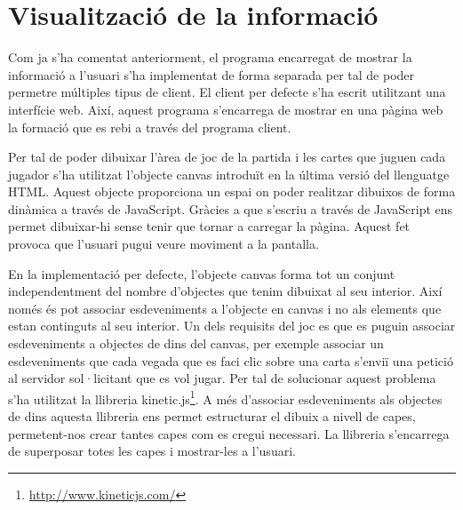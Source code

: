 \section{Visualització de la informació}
\label{sec:visualitzacio-informacio}

Com ja s'ha comentat anteriorment, el programa encarregat de mostrar la informació a l'usuari s'ha implementat de forma separada per tal de poder permetre múltiples tipus de client. El client per defecte s'ha escrit utilitzant una interfície web. Així, aquest programa s'encarrega de mostrar en una pàgina web la formació que es rebi a través del programa client.

Per tal de poder dibuixar l'àrea de joc de la partida i les cartes que juguen cada jugador s'ha utilitzat l'objecte canvas introduït en la última versió del llenguatge HTML. Aquest objecte proporciona un espai on poder realitzar dibuixos de forma dinàmica a través de JavaScript. Gràcies a que s'escriu a través de JavaScript ens permet dibuixar-hi sense tenir que tornar a carregar la pàgina. Aquest fet provoca que l'usuari pugui veure moviment a la pantalla. 

En la implementació per defecte, l'objecte canvas forma tot un conjunt independentment del nombre d'objectes que tenim dibuixat al seu interior. Així només és pot associar esdeveniments a l'objecte en canvas i no als elements que estan continguts al seu interior. Un dels requisits del joc es que es puguin associar esdeveniments a objectes de dins del canvas, per exemple associar un esdeveniments que cada vegada que es faci clic sobre una carta s'enviï una petició al servidor sol·licitant que es vol jugar. Per tal de solucionar aquest problema s'ha utilitzat la llibreria kinetic.js\footnote{\url{http://www.kineticjs.com/}}. A més d'associar esdeveniments als objectes de dins aquesta llibreria ens permet estructurar el dibuix a nivell de capes, permetent-nos crear tantes capes com es cregui necessari. La llibreria s'encarrega de superposar totes les capes i mostrar-les a l'usuari. 
